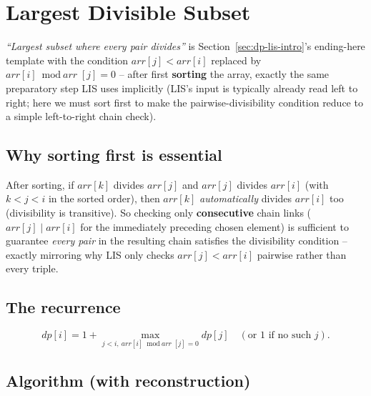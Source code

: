 \section{Largest Divisible Subset}
\label{sec:dp-largest-divisible-subset}


\begin{patternbox}
\emph{``Largest subset where every pair divides''} is
Section~\ref{sec:dp-lis-intro}'s ending-here template with the
condition $\textit{arr}[j] < \textit{arr}[i]$ replaced by
$\textit{arr}[i] \bmod \textit{arr}[j] = 0$ -- after first
\textbf{sorting} the array, exactly the same preparatory step LIS uses
implicitly (LIS's input is typically already read left to right; here
we must sort first to make the pairwise-divisibility condition reduce
to a simple left-to-right chain check).
\end{patternbox}

\subsection*{Why sorting first is essential}

After sorting, if $\textit{arr}[k]$ divides $\textit{arr}[j]$ and
$\textit{arr}[j]$ divides $\textit{arr}[i]$ (with $k<j<i$ in the sorted
order), then $\textit{arr}[k]$ \emph{automatically} divides
$\textit{arr}[i]$ too (divisibility is transitive). So checking only
\textbf{consecutive} chain links ($\textit{arr}[j] \mid
\textit{arr}[i]$ for the immediately preceding chosen element) is
sufficient to guarantee \emph{every pair} in the resulting chain
satisfies the divisibility condition -- exactly mirroring why LIS only
checks $\textit{arr}[j]<\textit{arr}[i]$ pairwise rather than every
triple.

\subsection*{The recurrence}

\[
  \textit{dp}[i] = 1 + \max_{j<i,\ \textit{arr}[i] \bmod
  \textit{arr}[j] = 0} \textit{dp}[j] \quad (\text{or } 1 \text{ if no
  such } j).
\]

\subsection*{Algorithm (with reconstruction)}

